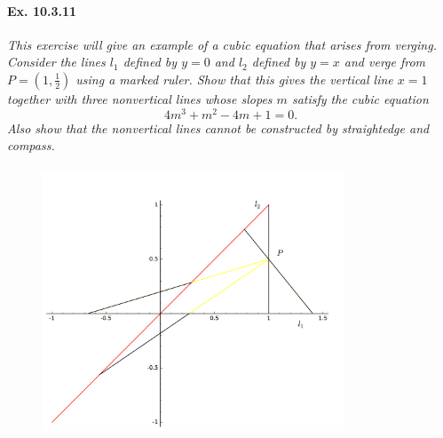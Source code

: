 \documentclass[11pt,a4paper]{article}
\begin{document}
\paragraph{Ex. 10.3.11}

{\it This exercise will give an example of a cubic equation that arises from verging. Consider the lines $l_1$ defined by $y=0$ and $l_2$ defined by $y=x$ and verge from $P = (1,\frac{1}{2})$ using a marked ruler. Show that this gives the vertical line $x=1$ together with three nonvertical lines whose slopes $m$ satisfy the cubic equation
$$ 4m^3+m^2-4m+1 = 0.$$
Also show that the nonvertical lines cannot be constructed by straightedge and compass.
}

\begin{figure}[htbp]
\begin{center}
\includegraphics [width=9cm,height=8cm] {marquedRulers3.pdf}
\end{center}
\end{figure}
\end{document}
